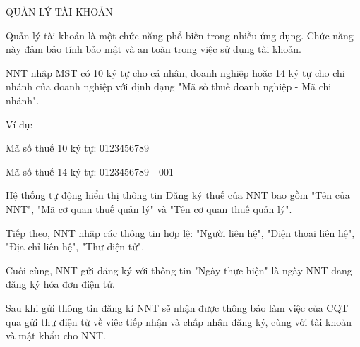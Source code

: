 QUẢN LÝ TÀI KHOẢN

Quản lý tài khoản là một chức năng phổ biến trong nhiều ứng dụng. Chức năng này đảm bảo tính bảo mật và an toàn trong việc sử dụng tài khoản.


NNT nhập MST có 10 ký tự cho cá nhân, doanh nghiệp hoặc 14 ký tự cho chi nhánh của doanh nghiệp với định dạng "Mã số thuế doanh nghiệp - Mã chi nhánh".

Ví dụ:

Mã số thuế 10 ký tự: 0123456789

Mã số thuế 14 ký tự: 0123456789 - 001

Hệ thống tự động hiển thị thông tin Đăng ký thuế của NNT bao gồm "Tên của NNT", "Mã cơ quan thuế quản lý" và "Tên cơ quan thuế quản lý".

Tiếp theo, NNT nhập các thông tin hợp lệ: "Người liên hệ", "Điện thoại liên hệ", "Địa chỉ liên hệ", "Thư điện tử".

Cuối cùng, NNT gửi đăng ký với thông tin "Ngày thực hiện" là ngày NNT đang đăng ký hóa đơn điện tử.

Sau khi gửi thông tin đăng kí NNT sẽ nhận được thông báo làm việc của CQT qua gửi thư điện tử về việc tiếp nhận và chấp nhận đăng ký, cùng với tài khoản và mật khẩu cho NNT.








